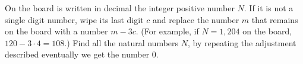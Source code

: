 On the board is written in decimal the integer positive number $N$. If it is not a single digit number, wipe its last digit $c$ and replace the number $m$ that remains on the board with a number $m -3c$. (For example, if $N = 1,204$ on the board, $120 - 3 \cdot  4 = 108$.) Find all the natural numbers $N$, by repeating the adjustment described eventually we get the number $0$.